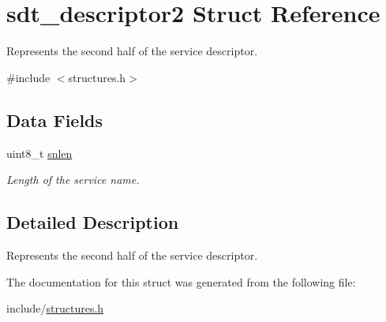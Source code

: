 \hypertarget{structsdt__descriptor2}{}\section{sdt\+\_\+descriptor2 Struct Reference}
\label{structsdt__descriptor2}


Represents the second half of the service descriptor.  




{\ttfamily \#include $<$structures.\+h$>$}

\subsection*{Data Fields}
\begin{DoxyCompactItemize}
\item 
uint8\+\_\+t \hyperlink{structsdt__descriptor2_a8c87b53d35ef2ea21a8bce6e99eaa740}{snlen}\hypertarget{structsdt__descriptor2_a8c87b53d35ef2ea21a8bce6e99eaa740}{}\label{structsdt__descriptor2_a8c87b53d35ef2ea21a8bce6e99eaa740}

\begin{DoxyCompactList}\small\item\em Length of the service name. \end{DoxyCompactList}\end{DoxyCompactItemize}


\subsection{Detailed Description}
Represents the second half of the service descriptor. 

The documentation for this struct was generated from the following file\+:\begin{DoxyCompactItemize}
\item 
include/\hyperlink{structures_8h}{structures.\+h}\end{DoxyCompactItemize}

